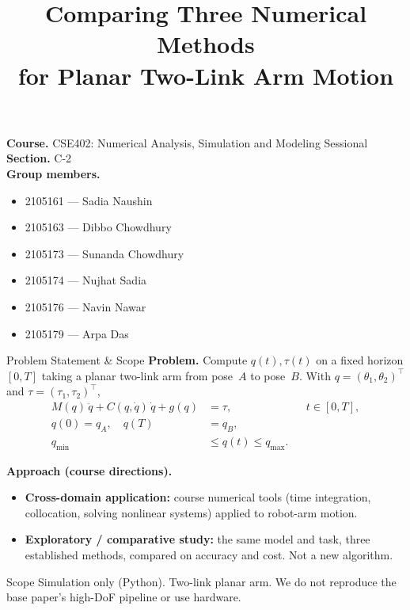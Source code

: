 \documentclass[10pt,aspectratio=169]{beamer}
\title{Comparing Three Numerical Methods\\for Planar Two-Link Arm Motion}
\date{}
\begin{document}
\begin{frame}[t]
  \vspace{0.15cm}

  \vspace{0.45cm}
  {\small
  \textbf{Course.} CSE402: Numerical Analysis, Simulation and Modeling Sessional\\[0.25em]
  \textbf{Section.} C-2\\[0.4em]
  \textbf{Group members.}
  \begin{itemize}
    \item 2105161 --- Sadia Naushin
    \item 2105163 --- Dibbo Chowdhury
    \item 2105173 --- Sunanda Chowdhury
    \item 2105174 --- Nujhat Sadia
    \item 2105176 --- Navin Nawar
    \item 2105179 --- Arpa Das
  \end{itemize}
  }
\end{frame}

\begin{frame}{Problem Statement \& Scope}
  \textbf{Problem.} Compute $q(t),\tau(t)$ on a fixed horizon $[0,T]$ taking a planar two-link arm from pose~$A$ to pose~$B$.
  With $q=(\theta_1,\theta_2)^\top$ and $\tau=(\tau_1,\tau_2)^\top$,
  {\small
  \begin{align*}
    M(q)\,\ddot q + C(q,\dot q)\,\dot q + g(q) &= \tau, && t\in[0,T],\\
    q(0)=q_A,\quad q(T)&=q_B,\\
    q_{\min} &\le q(t) \le q_{\max}.
  \end{align*}
  }

  \vspace{0.15cm}
  \textbf{Approach (course directions).}
  \begin{itemize}
    \item \textbf{Cross-domain application:} course numerical tools (time integration, collocation, solving nonlinear systems) applied to robot-arm motion.
    \item \textbf{Exploratory / comparative study:} the same model and task, three established methods, compared on accuracy and cost. Not a new algorithm.
  \end{itemize}

  \vspace{0.15cm}
  \begin{block}{Scope}
    {\small Simulation only (Python). Two-link planar arm. We do not reproduce the base paper's high-DoF pipeline or use hardware.}
  \end{block}
\end{frame}
\end{document}
